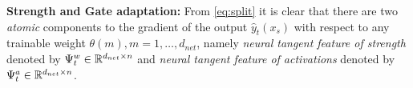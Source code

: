 {\begin{definition}
\end{definition}

\textbf{Strength and Gate adaptation:} From \eqref{eq:split} it is clear that there are two \emph{atomic} components to the gradient of the output $\hat{y}_t(x_s)$ with respect to any trainable weight $\theta(m), m=1,\ldots, d_{net}$, namely \emph{neural tangent feature of strength} denoted by $\Psi^w_{t}\in \mathbb{R}^{d_{net}\times n}$ and \emph{neural tangent feature of activations} denoted by $\Psi^a_{t}\in \mathbb{R}^{d_{net}\times n}$. %

}


